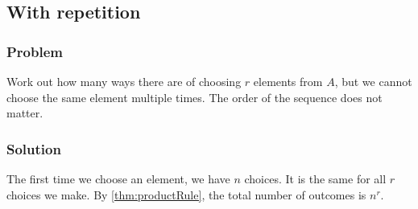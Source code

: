 \documentclass[a4paper,12pt]{article}
\begin{document}
\subsection{With repetition}
\subsubsection{Problem}
Work out how many ways there are of choosing $r$ elements from $A$, but we cannot choose the same element multiple times. The order of the sequence does not matter.

\subsubsection{Solution}
The first time we choose an element, we have $n$ choices. It is the same for all $r$ choices we make. By \cref{thm:productRule}, the total number of outcomes is $n^r$.
\end{document}
